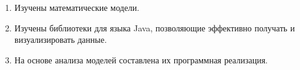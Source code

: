 \begin{enumerate}
  \item Изучены математические модели.
  \item Изучены библиотеки для языка Java, позволяющие эффективно получать и визуализировать данные.
  \item На основе анализа моделей составлена их программная реализация. 
\end{enumerate}
